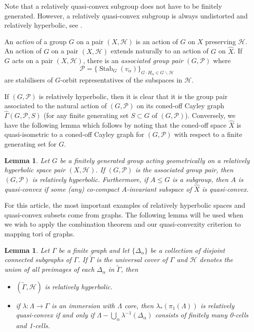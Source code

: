 \documentclass[11pt, a4paper]{amsart}
\newtheorem{lemma}[theorem]{Lemma}
\theoremstyle{definition}
\newcommand{\wh}[1]{\widehat{ #1 }}
\DeclareMathOperator{\stab}{Stab}
\begin{document}
Note that a relatively quasi-convex subgroup does not have to be finitely generated. However, a relatively quasi-convex subgroup is always undistorted and relatively hyperbolic, see \cite{Hr10}.

An \emph{action} of a group $G$ on a pair $(X, \mathcal{H})$ is an action of $G$ on $X$ preserving $\mathcal{H}$. An action of $G$ on a pair $(X, \mathcal{H})$ extends naturally to an action of $G$ on $\widehat{X}$. If $G$ acts on a pair $(X, \mathcal{H})$, there is an \emph{associated group pair} $(G, \mathcal{P})$ where
\[
\mathcal{P} = \{\stab_G(v_{\alpha})\}_{G\cdot H_{\alpha}\in G\backslash\mathcal{H}}
\]
are stabilisers of $G$-orbit representatives of the subspaces in $\mathcal{H}$. 

If $(G, \mathcal{P})$ is relatively hyperbolic, then it is clear that it is the group pair associated to the natural action of $(G, \mathcal{P})$ on its coned-off Cayley graph $\wh{\Gamma}(G, \mathcal{P}, S)$ (for any finite generating set $S\subset G$ of $(G, \mathcal{P})$). Conversely, we have the following lemma which follows by noting that the coned-off space $\widehat{X}$ is quasi-isometric to a coned-off Cayley graph for $(G, \mathcal{P})$ with respect to a finite generating set for $G$.

\begin{lemma}
\label{lem:action_def}
Let $G$ be a finitely generated group acting geometrically on a relatively hyperbolic space pair $(X, \mathcal{H})$. If $(G, \mathcal{P})$ is the associated group pair, then $(G, \mathcal{P})$ is relatively hyperbolic. Furthermore, if $A\leqslant G$ is a subgroup, then $A$ is quasi-convex if some (any) co-compact $A$-invariant subspace of $\wh{X}$ is quasi-convex.
\end{lemma}

For this article, the most important examples of relatively hyperbolic spaces and quasi-convex subsets come from graphs. The following lemma will be used when we wish to apply the combination theorem and our quasi-convexity criterion to mapping tori of graphs.

\begin{lemma}
\label{lem:tree_rel_hyp}
Let $\Gamma$ be a finite graph and let $\{\Delta_{\alpha}\}$ be a collection of disjoint connected subgraphs of $\Gamma$. If $\widetilde{\Gamma}$ is the universal cover of $\Gamma$ and $\mathcal{H}$ denotes the union of all preimages of each $\Delta_{\alpha}$ in $\widetilde{\Gamma}$, then 
\begin{itemize}
\item $\left(\widetilde{\Gamma}, \mathcal{H}\right)$ is relatively hyperbolic.
\item if $\lambda\colon\Lambda\to \Gamma$ is an immersion with $\Lambda$ core, then $\lambda_*(\pi_1(\Lambda))$ is relatively quasi-convex if and only if $\Lambda - \bigcup_{\alpha}\lambda^{-1}(\Delta_{\alpha})$ consists of finitely many 0-cells and 1-cells.
\end{itemize}
\end{lemma}
\end{document}
